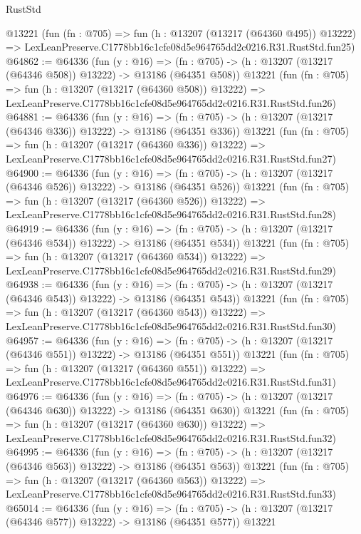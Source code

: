\begin{lexlean}{RustStd}
\begin{coremodule}
    @13221
    (fun (fn : @705) =>
    fun (h : @13207 (@13217 (@64360 @495)) @13222) =>
    LexLeanPreserve.C1778bb16c1cfe08d5e964765dd2c0216.R31.RustStd.fun25)
@64862 := @64336
    (fun (y : @16) =>
    (fn : @705) -> (h : @13207 (@13217 (@64346 @508)) @13222) -> @13186 (@64351 @508))
    @13221
    (fun (fn : @705) =>
    fun (h : @13207 (@13217 (@64360 @508)) @13222) =>
    LexLeanPreserve.C1778bb16c1cfe08d5e964765dd2c0216.R31.RustStd.fun26)
@64881 := @64336
    (fun (y : @16) =>
    (fn : @705) -> (h : @13207 (@13217 (@64346 @336)) @13222) -> @13186 (@64351 @336))
    @13221
    (fun (fn : @705) =>
    fun (h : @13207 (@13217 (@64360 @336)) @13222) =>
    LexLeanPreserve.C1778bb16c1cfe08d5e964765dd2c0216.R31.RustStd.fun27)
@64900 := @64336
    (fun (y : @16) =>
    (fn : @705) -> (h : @13207 (@13217 (@64346 @526)) @13222) -> @13186 (@64351 @526))
    @13221
    (fun (fn : @705) =>
    fun (h : @13207 (@13217 (@64360 @526)) @13222) =>
    LexLeanPreserve.C1778bb16c1cfe08d5e964765dd2c0216.R31.RustStd.fun28)
@64919 := @64336
    (fun (y : @16) =>
    (fn : @705) -> (h : @13207 (@13217 (@64346 @534)) @13222) -> @13186 (@64351 @534))
    @13221
    (fun (fn : @705) =>
    fun (h : @13207 (@13217 (@64360 @534)) @13222) =>
    LexLeanPreserve.C1778bb16c1cfe08d5e964765dd2c0216.R31.RustStd.fun29)
@64938 := @64336
    (fun (y : @16) =>
    (fn : @705) -> (h : @13207 (@13217 (@64346 @543)) @13222) -> @13186 (@64351 @543))
    @13221
    (fun (fn : @705) =>
    fun (h : @13207 (@13217 (@64360 @543)) @13222) =>
    LexLeanPreserve.C1778bb16c1cfe08d5e964765dd2c0216.R31.RustStd.fun30)
@64957 := @64336
    (fun (y : @16) =>
    (fn : @705) -> (h : @13207 (@13217 (@64346 @551)) @13222) -> @13186 (@64351 @551))
    @13221
    (fun (fn : @705) =>
    fun (h : @13207 (@13217 (@64360 @551)) @13222) =>
    LexLeanPreserve.C1778bb16c1cfe08d5e964765dd2c0216.R31.RustStd.fun31)
@64976 := @64336
    (fun (y : @16) =>
    (fn : @705) -> (h : @13207 (@13217 (@64346 @630)) @13222) -> @13186 (@64351 @630))
    @13221
    (fun (fn : @705) =>
    fun (h : @13207 (@13217 (@64360 @630)) @13222) =>
    LexLeanPreserve.C1778bb16c1cfe08d5e964765dd2c0216.R31.RustStd.fun32)
@64995 := @64336
    (fun (y : @16) =>
    (fn : @705) -> (h : @13207 (@13217 (@64346 @563)) @13222) -> @13186 (@64351 @563))
    @13221
    (fun (fn : @705) =>
    fun (h : @13207 (@13217 (@64360 @563)) @13222) =>
    LexLeanPreserve.C1778bb16c1cfe08d5e964765dd2c0216.R31.RustStd.fun33)
@65014 := @64336
    (fun (y : @16) =>
    (fn : @705) -> (h : @13207 (@13217 (@64346 @577)) @13222) -> @13186 (@64351 @577))
    @13221

\end{coremodule}
\end{lexlean}
